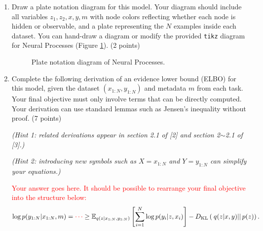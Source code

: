 \documentclass[12pt]{article}
\newcommand{\kld}[2]{D_{\mathrm{KL}} \left( \left. \left. #1 \right|\right| #2 \right) }
\begin{document}
\begin{enumerate}[label=(\alph*)]
\item 
Draw a plate notation diagram for this model.
Your diagram should include all variables $z_1, z_2, x, y, m$ with node colors reflecting whether each node is hidden or observable, and a plate representing the $N$ examples inside each dataset.
You can hand-draw a diagram or modify the provided \texttt{tikz} diagram for Neural Processes (Figure \ref{fig:plate_np}).
(2 points)
\begin{figure}
\centering
{}
\caption{ \label{fig:plate_np}
Plate notation diagram of Neural Processes.}
\end{figure}

\item 
Complete the following derivation of an evidence lower bound (ELBO) for this model, given the dataset $(x_{1:N}, y_{1:N})$ and metadata $m$ from each task.
Your final objective must only involve terms that can be directly computed.
Your derivation can use standard lemmas such as Jensen's inequality without proof.
(7 points)

\textit{\small (Hint 1: related derivations appear in section 2.1 of [2] and section 2$\sim$2.1 of [3].)}

\textit{\small (Hint 2: introducing new symbols such as $X=x_{1:N}$ and $Y=y_{1:N}$ can simplify your equations.)}

\textcolor{red}{Your answer goes here. It should be possible to rearrange your final objective into the structure below:}
\begin{align}
\log p(y_{1:N} | x_{1:N}, m)
= \textcolor{red}{\cdots}
\geq \mathbb{E}_{
q(z|x_{1:N},y_{1:N})
}
\left[ 
\sum_{i=1}^{N}\log p(y_{i}|z,x_{i})
\right] 
-\kld{q(z|x,y)}{p(z)}.
\end{align}
\end{enumerate}
\end{document}
